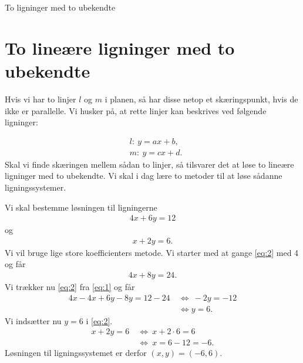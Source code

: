 \begin{center}
\Huge
To ligninger med to ubekendte
\end{center}
\section*{To lineære ligninger med to ubekendte}

Hvis vi har to linjer $l$ og $m$ i planen, så har disse netop et skæringspunkt, hvis de ikke er parallelle. Vi husker på, at rette linjer kan beskrives ved følgende ligninger:

\begin{align*}
	&l:\ y=ax + b,\\
	&m:\ y=cx + d.
\end{align*}
Skal vi finde skæringen mellem sådan to linjer, så tilsvarer det at løse to lineære ligninger med to ubekendte. Vi skal i dag lære to metoder til at løse sådanne ligningssystemer.
\begin{exa}
	Vi skal bestemme løsningen til ligningerne
	\begin{align}\label{eq:1}
		4x+6y = 12
	\end{align}
	og 
	\begin{align}\label{eq:2}
		x+2y=6.
	\end{align}
	Vi vil bruge lige store koefficienters metode. Vi starter med at gange \eqref{eq:2} med 4 og får
	\begin{align*}
		4x+8y=24.
	\end{align*}
	Vi trækker nu \eqref{eq:2} fra \eqref{eq:1} og får
	\begin{align*}
		4x-4x+6y-8y = 12-24 \ &\Leftrightarrow\ -2y = -12\\
		&\Leftrightarrow y = 6.
	\end{align*}
	Vi indsætter nu 	$y=6$ i \eqref{eq:2}.
	\begin{align*}
		x + 2y = 6 \ &\Leftrightarrow \ x+2\cdot 6 = 6\\
		&\Leftrightarrow	\ x = 6-12 = -6.
	\end{align*}
	Løsningen til ligningssystemet er derfor $(x,y) = (-6,6)$.
\end{exa}

